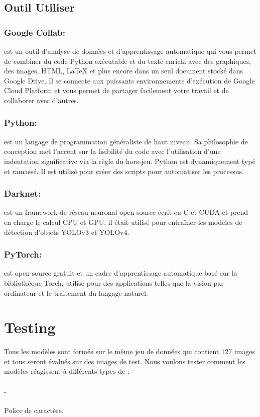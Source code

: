      \subsection{Outil Utiliser}
               \subsubsection{Google Collab:} est un outil d'analyse de données et d'apprentissage automatique qui vous permet de combiner du code Python exécutable et du texte enrichi avec des 	graphiques, des images, HTML, LaTeX et plus encore dans un seul document stocké dans Google Drive. Il se connecte aux puissants environnements d'exécution de Google Cloud Platform et vous permet de partager facilement votre travail et de collaborer avec d'autres.
               \subsubsection{Python:} est un langage de programmation généraliste de haut niveau. Sa philosophie de conception met l'accent sur la lisibilité du code avec l'utilisation d'une indentation significative via la règle du hors-jeu. Python est dynamiquement typé et ramassé. Il est utilisé pour créer des scripts pour automatiser les processus. 
               \subsubsection{Darknet:} est un framework de réseau neuronal open source écrit en C et CUDA et prend en charge le calcul CPU et GPU. il était utilisé pour entraîner les modèles de détection d'objets YOLOv3 et YOLOv4.
               \subsubsection{PyTorch:} est open-source gratuit et un cadre d'apprentissage automatique basé sur la bibliothèque Torch, utilisé pour des applications telles que la vision par ordinateur et le traitement du langage naturel.


\section{Testing}
     Tous les modèles sont formés sur le même jeu de données qui contient 127 images et tous seront évalués sur des images de test.
     Nous voulons tester comment les modèles réagissent à différents types de :
     \paragraph{-} Police de caractère.
